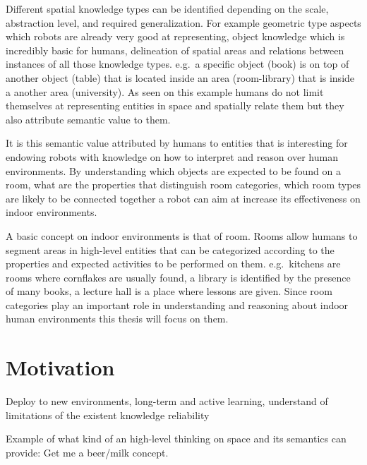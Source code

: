 Different spatial knowledge types can be identified depending on the scale, abstraction level,
and required generalization. For example geometric type aspects which robots are already very
good at representing, object knowledge which is incredibly basic for humans, delineation
of spatial areas and relations between instances of all those knowledge types. e.g.\ a specific
object (book) is on top of another object (table) that is located inside an area (room-library)
that is inside a another area (university).
As seen on this example humans do not limit themselves at representing entities
in space and spatially relate them but they also attribute semantic value to them.

It is this semantic value attributed by humans to entities that is interesting for endowing
robots with knowledge on how to interpret and reason over human environments.
By understanding which objects are expected to be found on a room, what are the properties that
distinguish room categories, which room types are likely to be connected together a robot can
aim at increase its effectiveness on indoor environments.

A basic concept on indoor environments is that of room. Rooms allow humans to segment areas
in high\hyp{}level entities that can be categorized according to the properties and expected
activities to be performed on them.
e.g.\ kitchens are rooms where cornflakes are usually found, a library is identified by the presence
of many books, a lecture hall is a place where lessons are given.
Since room categories play an important role in understanding and reasoning about
indoor human environments this thesis will focus on them.

\section{Motivation}

Deploy to new environments, long-term and active learning,
understand of limitations of the existent knowledge
reliability

Example of what kind of an high-level thinking on space and its semantics can
provide: Get me a beer/milk concept.


%
%
%
%

